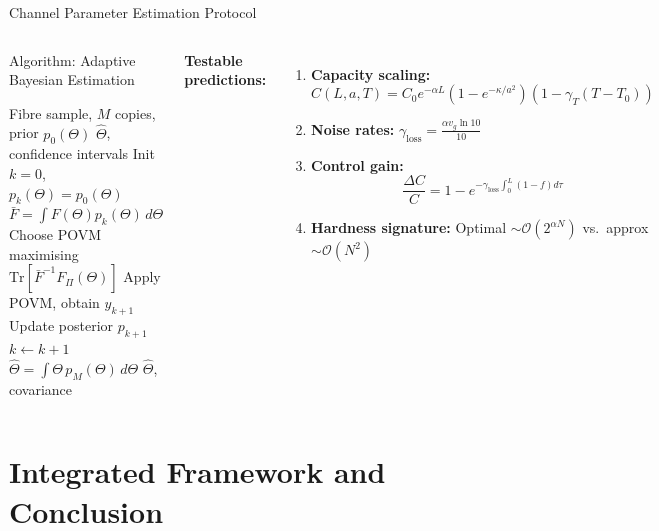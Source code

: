 \documentclass[aspectratio=169,10pt]{beamer}
\newcommand{\Tr}{\mathrm{Tr}}
\begin{document}
\begin{frame}{Channel Parameter Estimation Protocol}
\begin{columns}[T]
    \begin{block}{Algorithm: Adaptive Bayesian Estimation}
      \begin{algorithmic}[1]
        \footnotesize
        \Require Fibre sample, $M$ copies, prior $p_0(\Theta)$
        \Ensure $\hat\Theta$, confidence intervals
        \State Init $k=0$, $p_k(\Theta)=p_0(\Theta)$
          \State $\bar F=\int F(\Theta)p_k(\Theta)\,d\Theta$
          \State Choose POVM maximising $\Tr[\bar F^{-1}F_\Pi(\Theta)]$
          \State Apply POVM, obtain $y_{k+1}$
          \State Update posterior $p_{k+1}$
          \State $k\leftarrow k+1$
        \EndWhile
        \State $\hat\Theta=\int\Theta\,p_M(\Theta)\,d\Theta$
        \Return $\hat\Theta$, covariance
      \end{algorithmic}
    \end{block}

    \textbf{Testable predictions:}
    \begin{enumerate}
      \item \textbf{Capacity scaling:}
        \[
          C(L,a,T)=C_0 e^{-\alpha L}(1{-}e^{-\kappa/a^2})
          (1{-}\gamma_T(T{-}T_0))
        \]
      \item \textbf{Noise rates:}
        $\gamma_{\text{loss}}=\frac{\alpha v_g\ln10}{10}$
      \item \textbf{Control gain:}
        \[
          \frac{\Delta C}{C}=1-e^{-\gamma_{\text{loss}}
          \int_0^L(1-f)d\tau}
        \]
      \item \textbf{Hardness signature:}
        Optimal $\sim\mathcal{O}(2^{\alpha N})$
        vs.\ approx $\sim\mathcal{O}(N^2)$
    \end{enumerate}
\end{columns}
\end{frame}

\section{Integrated Framework and Conclusion}
\end{document}
